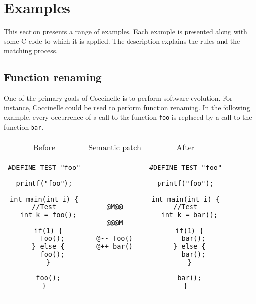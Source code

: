 
\section{Examples}

This section presents a range of examples.  Each
example is presented along with some C code to which it is
applied. The description explains the rules and the matching process.

\subsection{Function renaming}

One of the primary goals of Coccinelle is to perform software
evolution.  For instance, Coccinelle could be used to perform function
renaming. In the following example, every occurrence of a call to the
function \texttt{foo} is replaced by a call to the
function \texttt{bar}.\\

\begin{tabular}{ccc}
Before & Semantic patch & After \\
\begin{minipage}[t]{.3\linewidth}
\begin{lstlisting}
#DEFINE TEST "foo"

printf("foo");

int main(int i) {
//Test
  int k = foo();

  if(1) {
    foo();
  } else {
    foo();
  }

  foo();
}
\end{lstlisting}
\end{minipage}
&
\begin{minipage}[t]{.3\linewidth}
\begin{lstlisting}[language=Cocci]
@M@@

@@@M

@-- foo()
@++ bar()
\end{lstlisting}
\end{minipage}
&
\begin{minipage}[t]{.3\linewidth}
\begin{lstlisting}
#DEFINE TEST "foo"

printf("foo");

int main(int i) {
//Test
  int k = bar();

  if(1) {
    bar();
  } else {
    bar();
  }

  bar();
}
\end{lstlisting}
\end{minipage}\\
\end{tabular}

